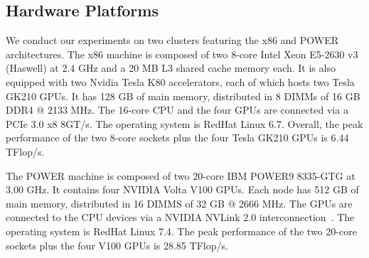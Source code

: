 \subsection{Hardware Platforms}
\label{sec:platform}
We conduct our experiments on two clusters featuring the x86 and POWER 
architectures.
The x86 machine is composed of two 8-core Intel Xeon
\textregistered E5-2630 v3 (Haswell) at 2.4 GHz and a 20 MB L3 shared cache 
memory each.  It is also equipped with two Nvidia Tesla K80 accelerators, each 
of which hosts two Tesla GK210 GPUs.
It has 128 GB of main memory, distributed in 8 DIMMs of 16 GB DDR4 @ 2133 MHz.
The 16-core CPU and the four GPUs are connected via a PCIe 3.0 x8 8GT/s.
The operating system is RedHat Linux 6.7.
Overall, the peak performance of the two 8-core sockets plus the four Tesla 
GK210 GPUs is 6.44 TFlop/s.

The POWER machine is composed of two 20-core IBM POWER9 8335-GTG at 3.00 GHz.  
It contains four NVIDIA Volta V100 GPUs.  
Each node has 512 GB of main memory, distributed in 16 DIMMS of 32 GB @ 2666 
MHz.  The GPUs are connected to the CPU devices via a NVIDIA NVLink 2.0 
interconnection~\cite{nvlink}.  The operating system is RedHat Linux 7.4.  The 
peak performance of the two 20-core sockets plus the four V100 GPUs is 28.85 
TFlop/s.
